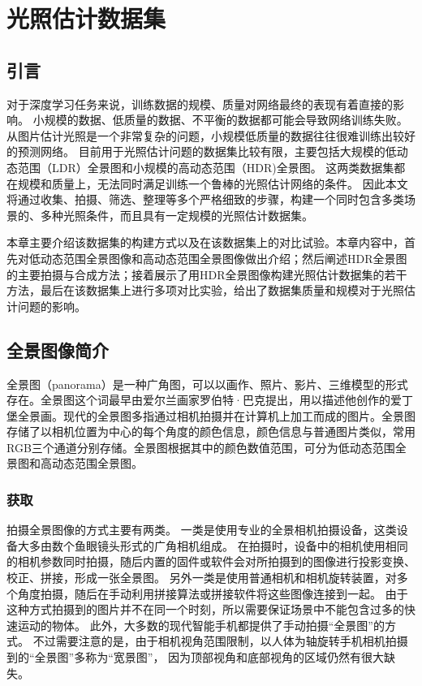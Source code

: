 \chapter{光照估计数据集}
\section{引言}
对于深度学习任务来说，训练数据的规模、质量对网络最终的表现有着直接的影响。
小规模的数据、低质量的数据、不平衡的数据都可能会导致网络训练失败。
从图片估计光照是一个非常复杂的问题，小规模低质量的数据往往很难训练出较好的预测网络。
目前用于光照估计问题的数据集比较有限，主要包括大规模的低动态范围（LDR）全景图和小规模的高动态范围（HDR)全景图。
这两类数据集都在规模和质量上，无法同时满足训练一个鲁棒的光照估计网络的条件。
因此本文将通过收集、拍摄、筛选、整理等多个严格细致的步骤，构建一个同时包含多类场景的、多种光照条件，而且具有一定规模的光照估计数据集。

本章主要介绍该数据集的构建方式以及在该数据集上的对比试验。本章内容中，首先对低动态范围全景图像和高动态范围全景图像做出介绍；然后阐述HDR全景图的主要拍摄与合成方法；接着展示了用HDR全景图像构建光照估计数据集的若干方法，最后在该数据集上进行多项对比实验，给出了数据集质量和规模对于光照估计问题的影响。

\section{全景图像简介}
全景图（panorama）是一种广角图，可以以画作、照片、影片、三维模型的形式存在。全景图这个词最早由爱尔兰画家罗伯特·巴克提出，用以描述他创作的爱丁堡全景画。现代的全景图多指通过相机拍摄并在计算机上加工而成的图片\cite{wikipedia}。全景图存储了以相机位置为中心的每个角度的颜色信息，颜色信息与普通图片类似，常用RGB三个通道分别存储。全景图根据其中的颜色数值范围，可分为低动态范围全景图和高动态范围全景图。

\subsection{获取}
拍摄全景图像的方式主要有两类。
一类是使用专业的全景相机拍摄设备，这类设备大多由数个鱼眼镜头形式的广角相机组成。
在拍摄时，设备中的相机使用相同的相机参数同时拍摄，随后内置的固件或软件会对所拍摄到的图像进行投影变换、校正、拼接，形成一张全景图。
另外一类是使用普通相机和相机旋转装置，对多个角度拍摄，随后在手动利用拼接算法或拼接软件将这些图像连接到一起。
由于这种方式拍摄到的图片并不在同一个时刻，所以需要保证场景中不能包含过多的快速运动的物体。
此外，大多数的现代智能手机都提供了手动拍摄“全景图”的方式。
不过需要注意的是，由于相机视角范围限制，以人体为轴旋转手机相机拍摄到的“全景图”多称为“宽景图”，
因为顶部视角和底部视角的区域仍然有很大缺失。

